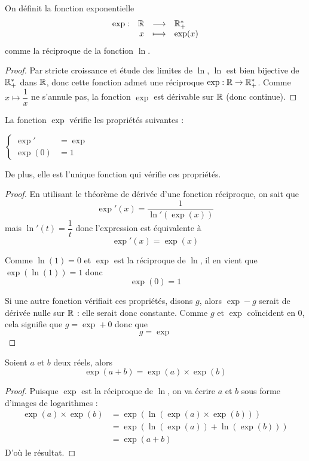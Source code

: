\begin{defi}[Exponentielle]
    On définit la fonction exponentielle $$\begin{array}[t]{lrcl} \exp: & \mathbb{R} & \longrightarrow & \mathbb{R}_+^* \\ & x & \longmapsto & \exp(x) \end{array}$$ comme la réciproque de la fonction $\ln$.
\end{defi}

\begin{proof}
    Par stricte croissance et étude des limites de $\ln$, $\ln$ est bien bijective de $\mathbb{R}_+^*$ dans $\mathbb{R}$, donc cette fonction admet une réciproque $\exp : \mathbb{R}\to\mathbb{R}_+^*$. Comme $x\mapsto\dfrac{1}{x}$ ne s'annule pas, la fonction $\exp$ est dérivable sur $\mathbb{R}$ (donc continue).
\end{proof}

\begin{prop}
    La fonction $\exp$ vérifie les propriétés suivantes :
    \begin{center}
        $\left\{\begin{array}{cc}
            \exp' &= \exp  \\
            \exp(0) &= 1
        \end{array}\right.$
    \end{center}

    De plus, elle est l'unique fonction qui vérifie ces propriétés.
\end{prop}

\begin{proof}
    En utilisant le théorème de dérivée d'une fonction réciproque, on sait que $$\exp'(x) = \dfrac{1}{\ln'(\exp(x))}$$ mais $\ln'(t) = \dfrac{1}{t}$ donc l'expression est équivalente à $$\boxed{\exp'(x) = \exp(x)}$$

    Comme $\ln(1) = 0$ et $\exp$ est la réciproque de $\ln$, il en vient que $\exp(\ln(1)) = 1$ donc $$\boxed{\exp(0) = 1}$$

    Si une autre fonction vérifiait ces propriétés, disons $g$, alors $\exp-g$ serait de dérivée nulle sur $\mathbb{R}$ : elle serait donc constante. Comme $g$ et $\exp$ coïncident en $0$, cela signifie que $g = \exp + 0$ donc que $$\boxed{g=\exp}$$
\end{proof}

\begin{prop}
    Soient $a$ et $b$ deux réels, alors $$\exp(a+b) = \exp(a)\times \exp(b)$$
\end{prop}

\begin{proof}
    Puisque $\exp$ est la réciproque de $\ln$, on va écrire $a$ et $b$ sous forme d'images de logarithmes :
    \begin{align*}
        \exp(a)\times \exp(b) &= \exp(\ln(\exp(a)\times \exp(b)))\\
        &= \exp(\ln(\exp(a))+\ln(\exp(b)))\\
        &= \exp(a+b)
    \end{align*}
    D'où le résultat.
\end{proof}

